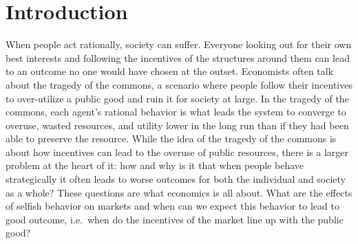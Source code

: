 \documentclass[12pt,twoside]{reedthesis}
\begin{document}

  \mainmatter %
  \pagestyle{fancyplain} %


    \chapter*{Introduction}

\doublespacing

When people act rationally, society can suffer. Everyone looking out for their own best interests and following the incentives of the structures around them can lead to an outcome no one would have chosen at the outset. Economists often talk about the tragedy of the commons, a scenario where people follow their incentives to over-utilize a public good and ruin it for society at large. In the tragedy of the commons, each agent's rational behavior is what leads the system to converge to overuse, wasted resources, and utility lower in the long run than if they had been able to preserve the resource. While the idea of the tragedy of the commons is about how incentives can lead to the overuse of public resources, there is a larger problem at the heart of it: how and why is it that when people behave strategically it often leads to worse outcomes for both the individual and society as a whole? These questions are what economics is all about. What are the effects of selfish behavior on markets and when can we expect this behavior to lead to good outcome, i.e.~when do the incentives of the market line up with the public good?
\end{document}
